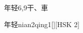 \begin{entry}{年轻}{6,9}{⼲、⾞}
  \begin{phonetics}{年轻}{nian2qing1}[][HSK 2]
  \end{phonetics}
\end{entry}

